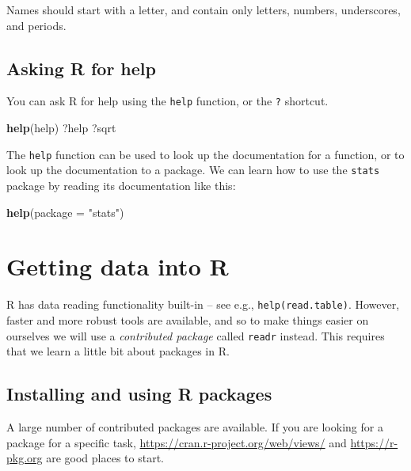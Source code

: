 \documentclass[]{book}
\newenvironment{Shaded}{\begin{snugshade}}{\end{snugshade}}
\newcommand{\KeywordTok}[1]{\textcolor[rgb]{0.13,0.29,0.53}{\textbf{#1}}}
\newcommand{\DataTypeTok}[1]{\textcolor[rgb]{0.13,0.29,0.53}{#1}}
\newcommand{\StringTok}[1]{\textcolor[rgb]{0.31,0.60,0.02}{#1}}
\newcommand{\NormalTok}[1]{#1}
\begin{document}
Names should start with a letter, and contain only letters, numbers,
underscores, and periods.

\subsection{Asking R for help}\label{asking-r-for-help}

You can ask R for help using the \texttt{help} function, or the
\texttt{?} shortcut.

\begin{Shaded}
\begin{Highlighting}[]
\KeywordTok{help}\NormalTok{(help)}
\NormalTok{?help}
\NormalTok{?sqrt}
\end{Highlighting}
\end{Shaded}

The \texttt{help} function can be used to look up the documentation for
a function, or to look up the documentation to a package. We can learn
how to use the \texttt{stats} package by reading its documentation like
this:

\begin{Shaded}
\begin{Highlighting}[]
\KeywordTok{help}\NormalTok{(}\DataTypeTok{package =} \StringTok{"stats"}\NormalTok{)}
\end{Highlighting}
\end{Shaded}

\section{Getting data into R}\label{getting-data-into-r}

R has data reading functionality built-in -- see e.g.,
\texttt{help(read.table)}. However, faster and more robust tools are
available, and so to make things easier on ourselves we will use a
\emph{contributed package} called \texttt{readr} instead. This requires
that we learn a little bit about packages in R.

\subsection{Installing and using R
packages}\label{installing-and-using-r-packages}

A large number of contributed packages are available. If you are looking
for a package for a specific task,
\url{https://cran.r-project.org/web/views/} and \url{https://r-pkg.org}
are good places to start.
\end{document}
